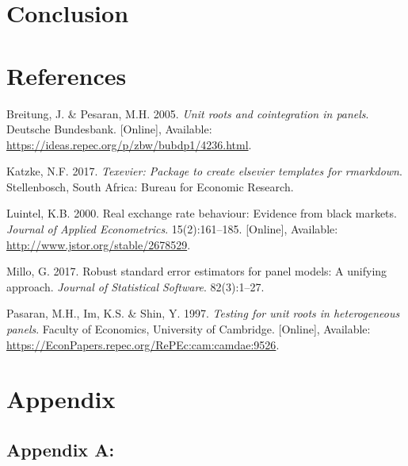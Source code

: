 \documentclass[11pt,preprint, authoryear]{elsarticle}
\numberwithin{equation}{section}
\numberwithin{figure}{section}
\numberwithin{table}{section}
\newlength{\cslhangindent}
\newenvironment{CSLReferences}%
  {\setlength{\parindent}{0pt}%
  \everypar{\setlength{\hangindent}{\cslhangindent}}\ignorespaces}%
  {\par}
\begin{document}
\hypertarget{conclusion}{%
\section{Conclusion}\label{conclusion}}

\newpage

\hypertarget{references}{%
\section*{References}\label{references}}

\hypertarget{refs}{}
\begin{CSLReferences}{1}{0}
\leavevmode\hypertarget{ref-pes}{}%
Breitung, J. \& Pesaran, M.H. 2005. \emph{Unit roots and cointegration
in panels}. Deutsche Bundesbank. {[}Online{]}, Available:
\url{https://ideas.repec.org/p/zbw/bubdp1/4236.html}.

\leavevmode\hypertarget{ref-Texevier}{}%
Katzke, N.F. 2017. \emph{{Texevier}: {P}ackage to create elsevier
templates for rmarkdown}. Stellenbosch, South Africa: Bureau for
Economic Research.

\leavevmode\hypertarget{ref-Kul}{}%
Luintel, K.B. 2000. Real exchange rate behaviour: Evidence from black
markets. \emph{Journal of Applied Econometrics}. 15(2):161--185.
{[}Online{]}, Available: \url{http://www.jstor.org/stable/2678529}.

\leavevmode\hypertarget{ref-plm}{}%
Millo, G. 2017. Robust standard error estimators for panel models: A
unifying approach. \emph{Journal of Statistical Software}. 82(3):1--27.

\leavevmode\hypertarget{ref-im}{}%
Pasaran, M.H., Im, K.S. \& Shin, Y. 1997. \emph{Testing for unit roots
in heterogeneous panels}. Faculty of Economics, University of Cambridge.
{[}Online{]}, Available:
\url{https://EconPapers.repec.org/RePEc:cam:camdae:9526}.

\end{CSLReferences}

\newpage

\hypertarget{appendix}{%
\section*{Appendix}\label{appendix}}

\hypertarget{appendix-a}{%
\subsection*{\texorpdfstring{Appendix A:
\label{A}}{Appendix A: }}\label{appendix-a}}
\end{document}

